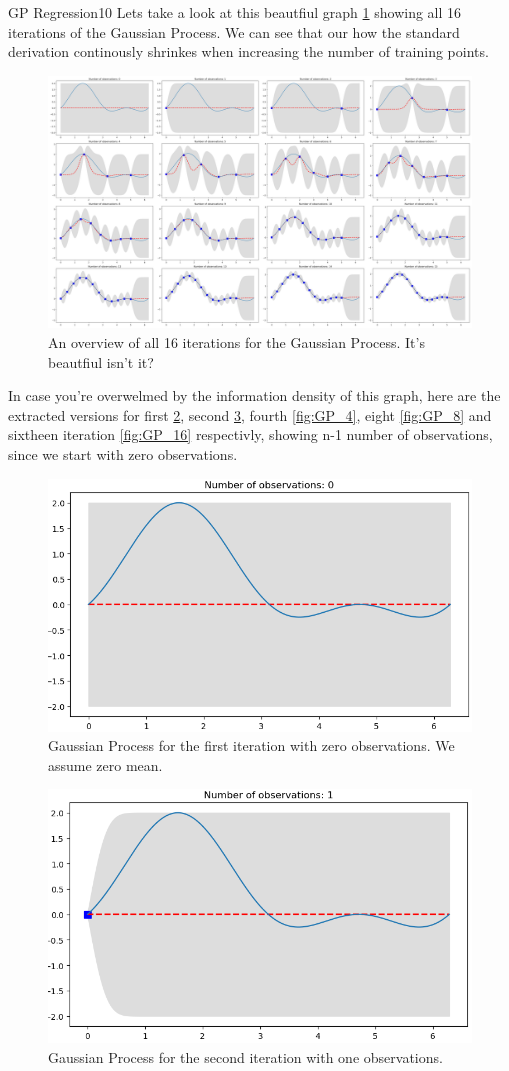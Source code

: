 \begin{questions}
\begin{question}{GP Regression}{10}
Lets take a look at this beautfiul graph \ref{fig:GP_all} showing all 16 iterations of the Gaussian Process. We can see that our how the standard derivation continously shrinkes when increasing the number of training points. 
\begin{figure}[H]
	\includegraphics[width=1.0\linewidth]{pictures/GP_all_plots.png}
	\centering
	\caption{An overview of all 16 iterations for the Gaussian Process. It's beautfiul isn't it?}
	\label{fig:GP_all}
\end{figure}

In case you're overwelmed by the information density of this graph, here are the extracted versions for first \ref{fig:GP_1}, second \ref{fig:GP_2}, fourth \ref{fig:GP_4}, eight \ref{fig:GP_8} and sixtheen iteration \ref{fig:GP_16} respectivly, showing n-1 number of observations, since we start with zero observations.
\begin{figure}[H]
	\includegraphics[width=0.6\linewidth]{pictures/GP_plot_1.png}
	\centering
	\caption{Gaussian Process for the first iteration with zero observations. We assume zero mean.}
	\label{fig:GP_1}
\end{figure}

\begin{figure}[H]
	\includegraphics[width=0.6\linewidth]{pictures/GP_plot_2.png}
	\centering
	\caption{Gaussian Process for the second iteration with one observations.}
	\label{fig:GP_2}
\end{figure}


\end{question}
\end{questions}
